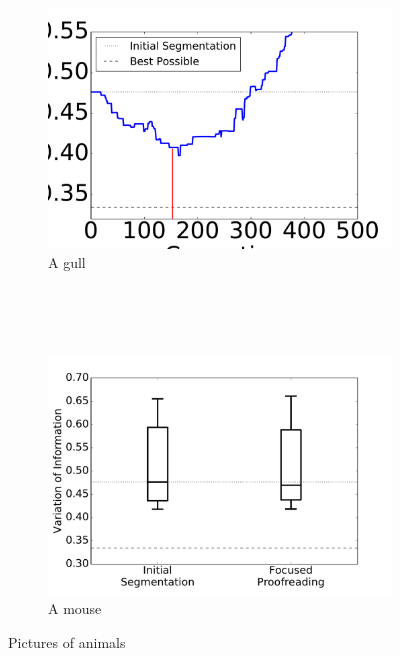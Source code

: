 \begin{figure}
    \centering
    \begin{subfigure}[b]{0.49\linewidth}
        \includegraphics[width=\textwidth]{gfx/gpauto.pdf}
        \caption{A gull}
        \label{fig:gull}
    \end{subfigure}
    ~ %

    ~ %
    \begin{subfigure}[b]{0.49\linewidth}
        \includegraphics[width=\textwidth]{gfx/fc_fp_ac4.pdf}
        \caption{A mouse}
        \label{fig:mouse}
    \end{subfigure}
    \caption{Pictures of animals}\label{fig:animals}
\end{figure}
